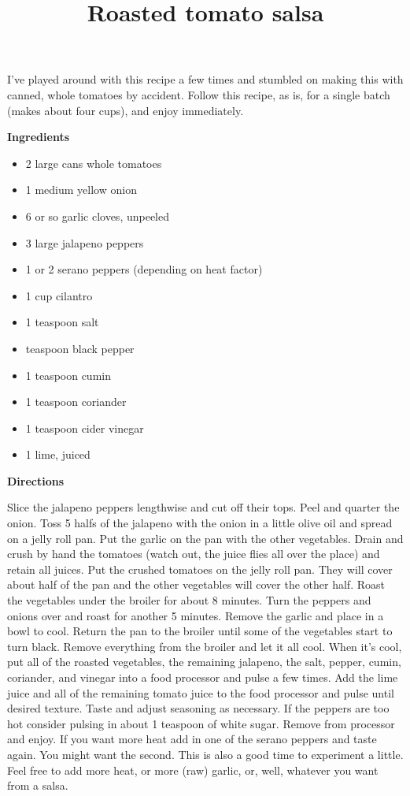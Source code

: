 \documentclass{article}
\title{Roasted tomato salsa}
\begin{document}
I've played around with this recipe a few times and stumbled on making this
with canned, whole tomatoes by accident. Follow this recipe, as is, for a
single batch (makes about four cups), and enjoy immediately.

\bigskip

\bigskip

\textbf{Ingredients}

\begin{itemize}
    \item 2 large cans whole tomatoes
    \item 1 medium yellow onion
    \item 6 or so garlic cloves, unpeeled
    \item 3 large jalapeno peppers
    \item 1 or 2 serano peppers (depending on heat factor)
    \item 1 cup cilantro
    \item 1 teaspoon salt
    \item {} teaspoon black pepper
    \item 1 teaspoon cumin
    \item 1 teaspoon coriander
    \item 1 teaspoon cider vinegar
    \item 1 lime, juiced
\end{itemize}

\bigskip

\textbf{Directions}

Slice the jalapeno peppers lengthwise and cut off their tops. Peel and
quarter the onion. Toss 5 halfs of the jalapeno with the onion in a
little olive oil and spread on a jelly roll pan. Put the garlic on the
pan with the other vegetables.
\medskip
Drain and crush by hand the tomatoes (watch out, the juice flies all
over the place) and retain all juices. Put the crushed tomatoes on the
jelly roll pan. They will cover about half of the pan and the other
vegetables will cover the other half.
\medskip
Roast the vegetables under the broiler for about 8 minutes. Turn the
peppers and onions over and roast for another 5 minutes. Remove the
garlic and place in a bowl to cool. Return the pan to the broiler until
some of the vegetables start to turn black.
\medskip
Remove everything from the broiler and let it all cool. When it's cool,
put all of the roasted vegetables, the remaining  jalapeno, the salt,
pepper, cumin, coriander, and vinegar into a food processor and pulse a
few times. Add the lime juice and all of the remaining tomato juice to the
food processor and pulse until desired texture.
\medskip
Taste and adjust seasoning as necessary. If the peppers are too hot
consider pulsing in about 1 teaspoon of white sugar. Remove from processor
and enjoy. If you want more heat add in one of the serano peppers and taste
again. You might want the second.
\medskip
This is also a good time to experiment a little. Feel free to add more heat,
or more (raw) garlic, or, well, whatever you want from a salsa.
\medskip
\end{document}
